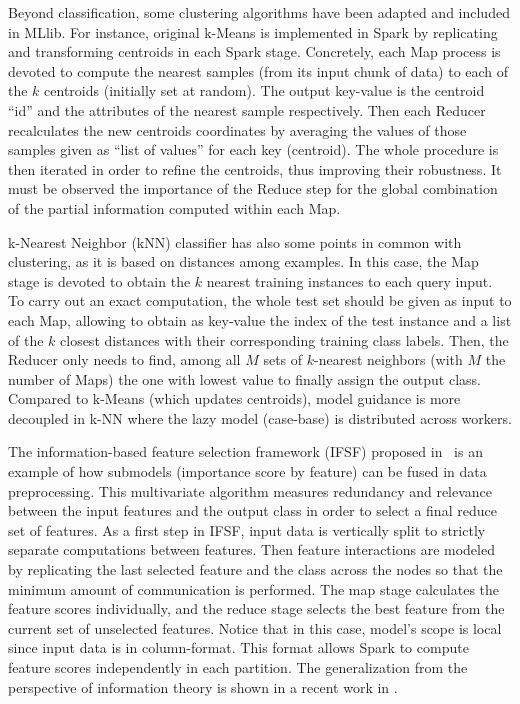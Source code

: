 \documentclass[3p,review]{elsarticle}
\begin{document}
	
	Beyond classification, some clustering algorithms have been adapted and included in MLlib. For instance, original k-Means is implemented in Spark by replicating and transforming centroids in each Spark stage. Concretely, each Map process is devoted to compute the nearest samples (from its input chunk of data) to each of the $k$ centroids (initially set at random). The output key-value is the centroid ``id'' and the attributes of the nearest sample respectively. Then each Reducer recalculates the new centroids coordinates by averaging the values of those samples given as ``list of values'' for each key (centroid). The whole procedure is then iterated in order to refine the centroids, thus improving their robustness. It must be observed the importance of the Reduce step for the global combination of the partial information computed within each Map.  
	
	k-Nearest Neighbor (kNN) classifier \cite{MailloRTH17-kNN} has also some points in common with clustering, as it is based on distances among examples. In this case, the Map stage is devoted to obtain the $k$ nearest training instances to each query input. To carry out an exact computation, the whole test set should be given as input to each Map, allowing to obtain as key-value the index of the test instance and a list of the $k$ closest distances with their corresponding training class labels. Then, the Reducer only needs to find, among all $M$ sets of $k$-nearest neighbors (with $M$ the number of Maps) the one with lowest value to finally assign the output class. Compared to k-Means (which updates centroids), model guidance is more decoupled in k-NN where the lazy model (case-base) is distributed across workers.
	
	The information-based feature selection framework (IFSF) proposed in~\cite{Ramirez-Gallego17-mrmr} is an example of how submodels (importance score by feature) can be fused in data preprocessing. This multivariate algorithm measures redundancy and relevance between the input features and the output class in order to select a final reduce set of features. As a first step in IFSF, input data is vertically split to strictly separate computations between features. Then feature interactions are modeled by replicating the last selected feature and the class across the nodes so that the minimum amount of communication is performed. The map stage calculates the feature scores individually, and the reduce stage selects the best feature from the current set of unselected features. Notice that in this case, model's scope is local since input data is in column-format. This format allows Spark to compute feature scores independently in each partition. The generalization from the perspective of information theory is shown in a recent work in \cite{Sergio17}.
	
\end{document}
